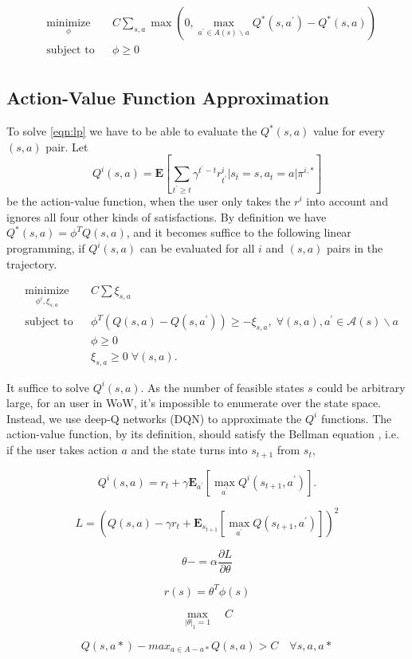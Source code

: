 \documentclass[a4paper]{article}
\begin{document}
\begin{equation*}
\begin{aligned}
& \underset{\phi}{\text{minimize}}
& & C\sum_{s,a} \max(0, \max_{a^\prime \in A(s)\backslash a}Q^\ast(s,a^\prime) - Q^\ast(s,a))\\
& \text{subject to}
& & \phi \geq 0 \; \\
\label{eqn:raw_lp}
\end{aligned}
\end{equation*}


\subsection{Action-Value Function Approximation}

To solve \ref{eqn:lp} we have to be able to evaluate the $Q^*(s,a)$ value for every $(s,a)$ pair. Let
$$Q^i(s,a)=\mathbf{E}[\sum_{t^\prime\geq t}\gamma^{t^\prime-t}r^i_{t^\prime} | s_{t}=s, a_{t}=a | \pi^{i,\ast}]$$
be the action-value function, when the user only takes the $r^i$ into account and ignores all four other kinds of satisfactions. By definition we have $Q^*(s,a)=\phi^TQ(s,a)$, and it becomes suffice to the following linear programming, if $Q^i(s,a)$ can be evaluated for all $i$ and $(s,a)$ pairs in the trajectory.

\begin{equation*}
\begin{aligned}
& \underset{\phi^i, \xi_{s,a}}{\text{minimize}}
& & C\sum \xi_{s,a} \\
& \text{subject to}
& & \phi^T(Q(s,a)-Q(s,a^\prime)) \geq - \xi_{s,a}, \; \forall (s,a), a^\prime \in \mathcal{A}(s)\backslash a \\
&&& \phi \geq 0 \; \\
&&& \xi_{s,a} \geq 0 \; \forall (s,a).
\label{eqn:lp}
\end{aligned}
\end{equation*}

It suffice to solve $Q^i(s,a)$. As the number of feasible states $s$ could be arbitrary large, for an user in WoW, it's impossible to enumerate over the state space. Instead, we use deep-Q networks (DQN) \cite{} to approximate the $Q^i$ functions. The action-value function, by its definition, should satisfy the Bellman equation \cite{}, i.e. if the user takes action
$a$ and the state turns into $s_{t+1}$ from $s_t$,

$$Q^i(s,a)=r_{t} + \gamma \mathbf{E}_{a^\prime}[\max_{a^\prime}Q^i(s_{t+1}, a^\prime)].$$

$$L=(Q(s,a)-\gamma r_{t} + \mathbf{E}_{s_{t+1}}[\max_{a^\prime}Q(s_{t+1}, a^\prime)])^2$$

$$\theta -= \alpha\frac{\partial L}{\partial \theta}$$



$$ r(s)=\theta^T \phi(s)$$

$$ \max_{|\theta|_1=1} \quad C$$

$$ Q(s,a*) - max_{a\in A-a*}Q(s,a) > C \quad\forall s,a,a*$$
\end{document}
